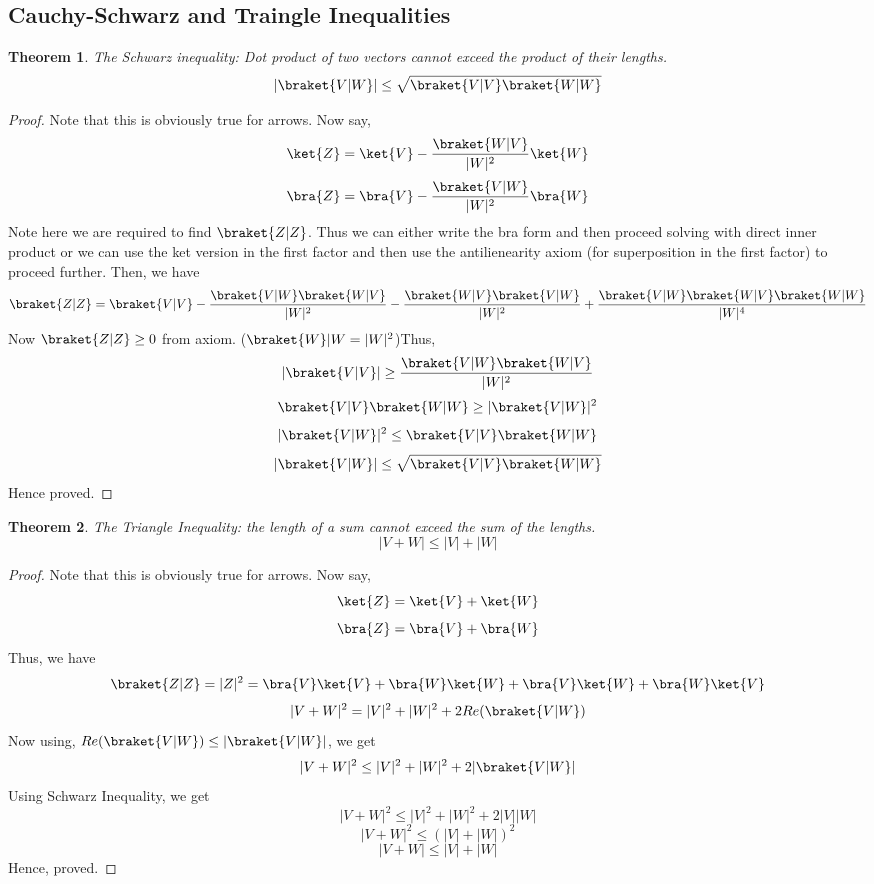 \documentclass[12pt, oneside]{book}
\newtheorem{theorem}{Theorem}[section]
\theoremstyle{definition}
\theoremstyle{definition}
\theoremstyle{remark}
\begin{document}
\subsection{Cauchy-Schwarz and Traingle Inequalities}
\begin{theorem}
    The Schwarz inequality: Dot product of two vectors cannot exceed the product of their lengths.
    \[|\braket{V|W}| \leq \sqrt{\braket{V|V}\braket{W|W}}\]
\end{theorem}
\begin{proof}
    Note that this is obviously true for arrows. Now say,
    \[\ket{Z}=\ket{V}-\frac{\braket{W|V}}{|W|^2}\ket{W}\]
    \[\bra{Z}=\bra{V}-\frac{\braket{V|W}}{|W|^2}\bra{W}\]
    Note  here we are required to find $\braket{Z|Z}$. Thus we can either write the bra form and then proceed solving with direct 
    inner product or we can use the ket version in the first factor and then use the antilienearity axiom (for superposition in the first factor) to proceed further. Then, we have
    \[\braket{Z|Z}=\braket{V|V}-\frac{\braket{V|W}\braket{W|V}}{|W|^2}-\frac{\braket{W|V}\braket{V|W}}{|W|^2}+\frac{\braket{V|W}\braket{W|V}\braket{W|W}}{|W|^4}\]
    Now $\braket{Z|Z}\geq 0$ from axiom. ($\braket{W}|W=|W|^2$)Thus,
    \[|\braket{V|V}| \geq \frac{\braket{V|W} \braket{W|V}}{|W|^2}\]
    \[\braket{V|V}\braket{W|W}\geq |{\braket{V|W}}|^2\]
    \[|\braket{V|W}|^2 \leq \braket{V|V}\braket{W|W}\]
    \[|{\braket{V|W}}| \leq \sqrt{\braket{V|V}\braket{W|W}}\]
    Hence proved.
\end{proof}
\begin{theorem}
    The Triangle Inequality: the length of a sum cannot exceed the sum of the lengths.
    \[|V+W| \leq |V| + |W|\]
\end{theorem}
\begin{proof}
    Note that this is obviously true for arrows. Now say,
    \[\ket{Z}=\ket{V}+\ket{W}\]
    \[\bra{Z}=\bra{V}+\bra{W}\]
    Thus, we have
    \[\braket{Z|Z}=|Z|^2=\bra{V}\ket{V}+\bra{W}\ket{W}+\bra{V}\ket{W}+\bra{W}\ket{V}\]
    \[|V+W|^2=|V|^2 + |W|^2 + 2Re(\braket{V|W})\]
    Now using, $Re(\braket{V|W}) \leq |{\braket{V|W}}|$, we get
    \[|{V+W}|^2 \leq |{V}|^2 + |{W}|^2 + 2|{\braket{V|W}}|\]
    Using Schwarz Inequality, we get
    \[|{V+W}|^2 \leq |{V}|^2 + |{W}|^2 + 2|{V}||{W}|\]
    \[|{V+W}|^2 \leq (|{V}|+|{W}|)^2\]
    \[|{V+W}| \leq |{V}| + |{W}|\]
    Hence, proved.
\end{proof}
\end{document}
